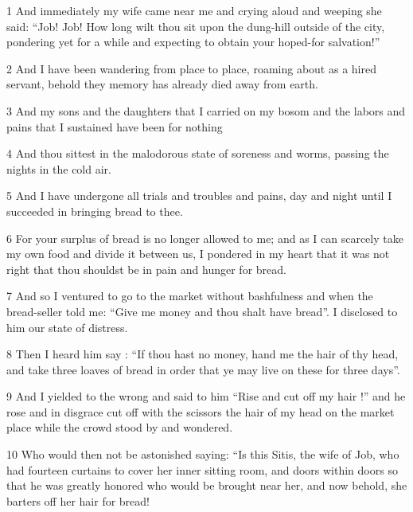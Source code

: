 \par 1 And immediately my wife came near me and crying aloud and weeping she said: “Job! Job! How long wilt thou sit upon the dung-hill outside of the city, pondering yet for a while and expecting to obtain your hoped-for salvation!”

\par 2 And I have been wandering from place to place, roaming about as a hired servant, behold they memory has already died away from earth.

\par 3 And my sons and the daughters that I carried on my bosom and the labors and pains that I sustained have been for nothing

\par 4 And thou sittest in the malodorous state of soreness and worms, passing the nights in the cold air.

\par 5 And I have undergone all trials and troubles and pains, day and night until I succeeded in bringing bread to thee.

\par 6 For your surplus of bread is no longer allowed to me; and as I can scarcely take my own food and divide it between us, I pondered in my heart that it was not right that thou shouldst be in pain and hunger for bread.

\par 7 And so I ventured to go to the market without bashfulness and when the bread-seller told me: “Give me money and thou shalt have bread”. I disclosed to him our state of distress.

\par 8 Then I heard him say : “If thou hast no money, hand me the hair of thy head, and take three loaves of bread in order that ye may live on these for three days”.

\par 9 And I yielded to the wrong and said to him “Rise and cut off my hair !” and he rose and in disgrace cut off with the scissors the hair of my head on the market place while the crowd stood by and wondered.

\par 10 Who would then not be astonished saying: “Is this Sitis, the wife of Job, who had fourteen curtains to cover her inner sitting room, and doors within doors so that he was greatly honored who would be brought near her, and now behold, she barters off her hair for bread!

